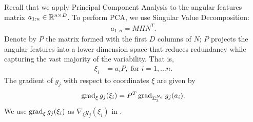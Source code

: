 Recall that we apply Principal Component Analysis to the angular features matrix  $a_{1:n} \in {\mathbb R}^{n \times D}$. To perform PCA, we use Singular Value Decomposition:
\begin{align*}
a_{1:n} = M \Pi N^T.
\end{align*}
Denote by $P$ the matrix formed with the first $D$ columns of $N$; $P$ projects the angular features into a lower dimension space that reduces redundancy while capturing the vast majority of the variability.  That is, \\
\begin{align*}
\xi_i &= a_i P,\;\text{for}\; i=1,\ldots n.
\end{align*}
The gradient of $g_j$ with respect to coordinates $\xi$ are given by
\begin{align*}
\operatorname{grad}_{\xi} g_j (\xi_i)= P^T \operatorname{grad}_{\Sigma_3^{N_a}} g_j (a_i).
\end{align*}
We use $\operatorname{grad}_{\xi} g_j (\xi_i)$ as $\nabla_{\xi} g_j (\xi_i)$ in \ouralg.



